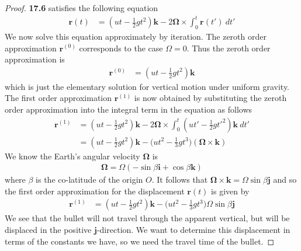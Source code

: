 \documentclass[11pt]{article}
\theoremstyle{definition}
\begin{document}
\begin{proof}{\textbf{17.6}}
    satisﬁes the following equation
    \begin{align*}
        \bm r(t)
        &= (ut - \frac{1}{2}gt^2)\bm{k}
        - 2\bm{\Omega}\times \int_0^t \bm{r}(t')~dt'
    \end{align*}
    We now solve this equation approximately by iteration. The zeroth order
    approximation $\bm{r}^{(0)}$ corresponds to the case $\Omega = 0$. Thus
    the zeroth order approximation is
    \begin{align*}
        \bm r^{(0)} &= (ut - \frac{1}{2}gt^2)\bm{k}
    \end{align*}
    which is just the elementary solution for vertical motion under uniform
    gravity. The ﬁrst order approximation $\bm{r}^{(1)}$ is now obtained
    by substituting the zeroth order approximation into the integral term in
    the equation as follows
    \begin{align*}
        \bm r^{(1)}
        &= (ut - \frac{1}{2}gt^2)\bm{k}
        - 2\bm{\Omega}\times \int_0^t (ut' - \frac{1}{2}gt'^2)\bm{k}~dt'\\
        &= (ut - \frac{1}{2}gt^2)\bm{k}
        - \bigg(
            ut^2 - \frac{1}{3}gt^3
        \bigg)(\bm{\Omega}\times\bm{k})
    \end{align*}
    We know the Earth's angular velocity $\bm{\Omega}$ is
    \begin{align*}
        \bm{\Omega} = \Omega(-\sin\beta\bm{i} + \cos\beta \bm{k})
    \end{align*}
    where $\beta$ is the co-latitude of the origin $O$.
    It follows that $\bm{\Omega}\times\bm{k} = \Omega\sin\beta \bm{j}$
    and so the ﬁrst order approximation for the displacement $\bm{r}(t)$
    is given by
    \begin{align*}
        \bm r^{(1)}
        &= (ut - \frac{1}{2}gt^2)\bm{k}
        - \bigg(ut^2 - \frac{1}{3}gt^3\bigg)\Omega\sin\beta \bm{j}
    \end{align*}
    We see that the bullet will not travel through the apparent vertical,
    but will be displaced in the positive $\bm{j}$-direction. We want to 
    determine this displacement in terms of the constants we have, so we need
    the travel time of the bullet.


\end{proof}
\end{document}
